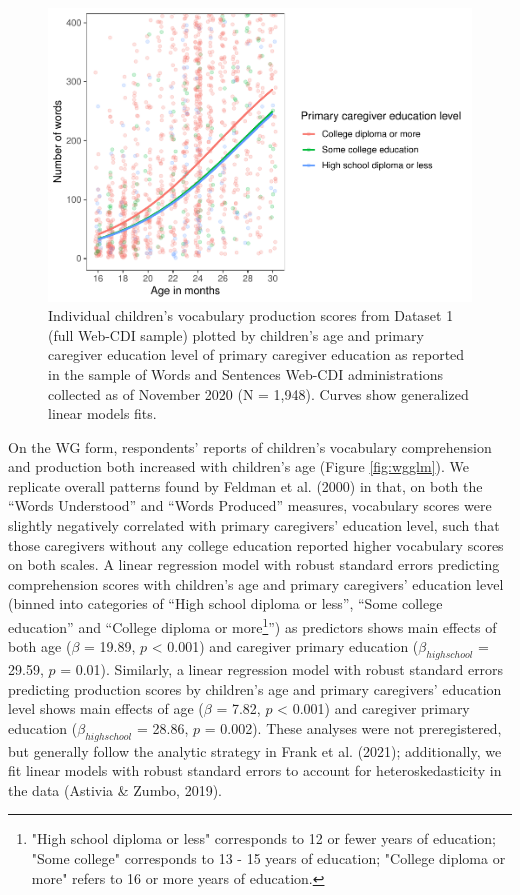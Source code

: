 \documentclass[
  english,
  ,man,floatsintext]{apa6}
\begin{document}
\begin{figure}
\centering
\includegraphics{webcdi_paper_files/figure-latex/wsglm-1.pdf}
\caption{\label{fig:wsglm}Individual children's vocabulary production scores from Dataset 1 (full Web-CDI sample) plotted by children's age and primary caregiver education level of primary caregiver education as reported in the sample of Words and Sentences Web-CDI administrations collected as of November 2020 (N = 1,948). Curves show generalized linear models fits.}
\end{figure}

On the WG form, respondents' reports of children's vocabulary comprehension and production both increased with children's age (Figure \ref{fig:wgglm}). We replicate overall patterns found by Feldman et al. (2000) in that, on both the \enquote{Words Understood} and \enquote{Words Produced} measures, vocabulary scores were slightly negatively correlated with primary caregivers' education level, such that those caregivers without any college education reported higher vocabulary scores on both scales. A linear regression model with robust standard errors predicting comprehension scores with children's age and primary caregivers' education level (binned into categories of \enquote{High school diploma or less}, \enquote{Some college education} and \enquote{College diploma or more\footnote{"High school diploma or less" corresponds to 12 or fewer years of education; "Some college" corresponds to 13 - 15 years of education; "College diploma or more" refers to 16 or more years of education.}}) as predictors shows main effects of both age (\(\beta\) = 19.89, \(p\) \textless{} 0.001) and caregiver primary education (\(\beta_{high school}\) = 29.59, \(p\) = 0.01). Similarly, a linear regression model with robust standard errors predicting production scores by children's age and primary caregivers' education level shows main effects of age (\(\beta\) = 7.82, \(p\) \textless{} 0.001) and caregiver primary education (\(\beta_{high school}\) = 28.86, \(p\) = 0.002). These analyses were not preregistered, but generally follow the analytic strategy in Frank et al. (2021); additionally, we fit linear models with robust standard errors to account for heteroskedasticity in the data (Astivia \& Zumbo, 2019).
\end{document}
